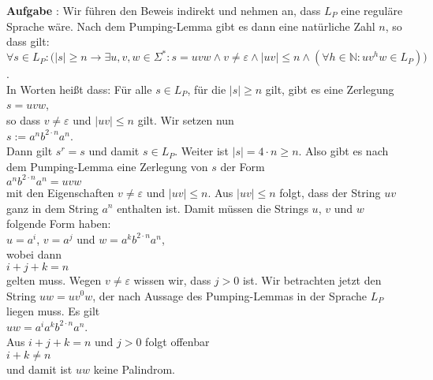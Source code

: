 \documentclass{article}
\newcounter{aufgabe}
\newcommand{\exercise}{\vspace*{0.3cm}
\stepcounter{aufgabe}

\noindent
\textbf{Aufgabe \arabic{aufgabe}}: }
\begin{document}
\exercise
Wir f\"uhren den Beweis indirekt und nehmen an, dass $L_P$ eine regul\"are Sprache w\"are.
Nach dem Pumping-Lemma gibt es dann eine nat\"urliche Zahl $n$, so dass gilt:
\\[0.2cm]
\hspace*{0.5cm}
  $\forall s \in L_P : \bigl(|s| \geq n \rightarrow \exists u,v,w\in \Sigma^* :
   s = uvw \wedge v \not= \varepsilon \wedge |uv| \leq n \wedge 
   (\forall h \in \mathbb{N}: uv^h w \in L_P)\bigr)
$.
\\[0.2cm]
In Worten hei{\ss}t dass: F\"ur alle $s \in L_P$, f\"ur die $|s| \geq n$ gilt, gibt es eine Zerlegung
\\[0.2cm]
\hspace*{1.3cm}
$s = uvw$,
\\[0.2cm]
so dass  $v \not= \varepsilon$ und $|uv| \leq n$ gilt.  Wir setzen nun
\\[0.2cm]
\hspace*{1.3cm}
$s := a^n b^{2 \cdot n} a^n$.
\\[0.2cm]
Dann gilt $s^r = s$ und damit $s \in L_P$.  Weiter ist $|s| = 4 \cdot n \geq n$.
Also gibt es nach dem Pumping-Lemma eine Zerlegung von $s$ der Form
\\[0.2cm]
\hspace*{1.3cm}
$a^nb^{2 \cdot n} a^n = uvw$
\\[0.2cm]
mit den Eigenschaften $v \not= \varepsilon$ und $|uv| \leq n$.  Aus $|uv| \leq n$ folgt, dass der
String $uv$ ganz in dem String $a^n$ enthalten ist.  Damit m\"ussen die Strings $u$, $v$ und $w$
folgende Form haben:
\\[0.2cm]
\hspace*{1.3cm}
$u = a^i$, \quad $v = a^j$ \quad und \quad $w = a^k b^{2 \cdot n} a^n$,
\\[0.2cm]
wobei dann
\\[0.2cm]
\hspace*{1.3cm}
$i + j + k = n$
\\[0.2cm]
gelten muss.  Wegen $v \not= \varepsilon$ wissen wir, dass $j > 0$ ist.
Wir betrachten jetzt den String $uw = u v^0 w$, der nach Aussage des Pumping-Lemmas in der Sprache
$L_P$ liegen muss.  Es gilt
\\[0.2cm]
\hspace*{1.3cm}
$uw = a^i a^k b^{2 \cdot n} a^n$.
\\[0.2cm]
Aus $i + j + k = n$ und $j > 0$ folgt offenbar
\\[0.2cm]
\hspace*{1.3cm}
$i + k \not= n$
\\[0.2cm]
und damit ist $uw$ keine Palindrom.
\pagebreak
\end{document}
